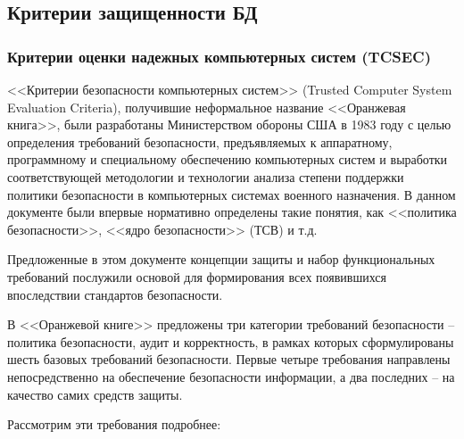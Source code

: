 \subsection{Критерии защищенности БД}

\subsubsection{Критерии оценки надежных компьютерных систем (TCSEC)}
<<Критерии безопасности компьютерных систем>> (Trusted Computer System Evaluation Criteria),
получившие неформальное название <<Оранжевая книга>>, были разработаны Министерством обороны
США в 1983 году с целью определения требований безопасности, предъявляемых к аппаратному,
программному и специальному обеспечению компьютерных систем и выработки соответствующей
методологии и технологии анализа степени поддержки политики безопасности в компьютерных
системах военного назначения. В данном документе были впервые нормативно определены такие
понятия, как <<политика безопасности>>, <<ядро безопасности>> (ТСВ) и т.д.

Предложенные в этом документе концепции защиты и набор функциональных требований послужили
основой для формирования всех появившихся впоследствии стандартов безопасности.

В <<Оранжевой книге>> предложены три категории требований безопасности -- политика безопасности,
аудит и корректность, в рамках которых сформулированы шесть базовых требований безопасности.
Первые четыре требования направлены непосредственно на обеспечение безопасности информации,
а два последних -- на качество самих средств защиты.

Рассмотрим эти требования подробнее:


